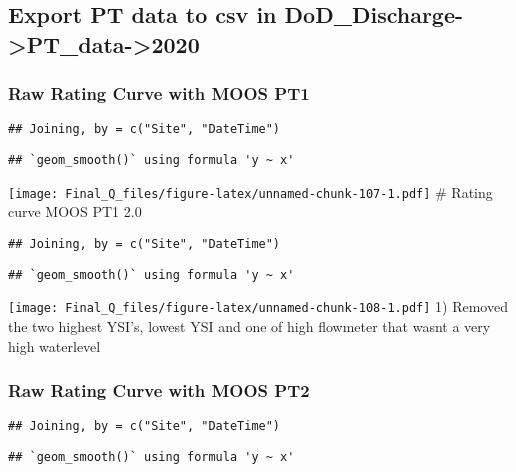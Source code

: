 \documentclass[
]{article}
\begin{document}
\hypertarget{export-pt-data-to-csv-in-dod_discharge-pt_data-2020}{%
\subsection{Export PT data to csv in
DoD\_Discharge-\textgreater PT\_data-\textgreater2020}\label{export-pt-data-to-csv-in-dod_discharge-pt_data-2020}}

\hypertarget{raw-rating-curve-with-moos-pt1}{%
\subsubsection{Raw Rating Curve with MOOS
PT1}\label{raw-rating-curve-with-moos-pt1}}

\begin{verbatim}
## Joining, by = c("Site", "DateTime")
\end{verbatim}

\begin{verbatim}
## `geom_smooth()` using formula 'y ~ x'
\end{verbatim}

\texttt{[image: Final\_Q\_files/figure-latex/unnamed-chunk-107-1.pdf]} \#
Rating curve MOOS PT1 2.0

\begin{verbatim}
## Joining, by = c("Site", "DateTime")
\end{verbatim}

\begin{verbatim}
## `geom_smooth()` using formula 'y ~ x'
\end{verbatim}

\texttt{[image: Final\_Q\_files/figure-latex/unnamed-chunk-108-1.pdf]} 1)
Removed the two highest YSI's, lowest YSI and one of high flowmeter that
wasnt a very high waterlevel

\hypertarget{raw-rating-curve-with-moos-pt2}{%
\subsubsection{Raw Rating Curve with MOOS
PT2}\label{raw-rating-curve-with-moos-pt2}}

\begin{verbatim}
## Joining, by = c("Site", "DateTime")
\end{verbatim}

\begin{verbatim}
## `geom_smooth()` using formula 'y ~ x'
\end{verbatim}
\end{document}
